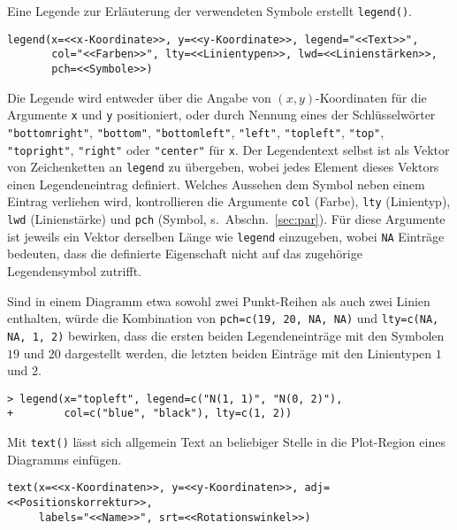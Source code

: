 Eine Legende zur Erläuterung der verwendeten Symbole erstellt \lstinline!legend()!.
\begin{lstlisting}
legend(x=<<x-Koordinate>>, y=<<y-Koordinate>>, legend="<<Text>>",
       col="<<Farben>>", lty=<<Linientypen>>, lwd=<<Linienstärken>>,
       pch=<<Symbole>>)
\end{lstlisting}

Die Legende wird entweder über die Angabe von $(x, y)$-Koordinaten für die Argumente \lstinline!x! und \lstinline!y! positioniert, oder durch Nennung eines der Schlüsselwörter \lstinline!"bottomright"!, \lstinline!"bottom"!, \lstinline!"bottomleft"!, \lstinline!"left"!, \lstinline!"topleft"!, \lstinline!"top"!, \lstinline!"topright"!, \lstinline!"right"! oder \lstinline!"center"! für \lstinline!x!. Der Legendentext selbst ist als Vektor von Zeichenketten an \lstinline!legend! zu übergeben, wobei jedes Element dieses Vektors einen Legendeneintrag definiert. Welches Aussehen dem Symbol neben einem Eintrag verliehen wird, kontrollieren die Argumente \lstinline!col! (Farbe), \lstinline!lty! (Linientyp), \lstinline!lwd! (Linienstärke) und \lstinline!pch! (Symbol, s.\ Abschn.\ \ref{sec:par}). Für diese Argumente ist jeweils ein Vektor derselben Länge wie \lstinline!legend! einzugeben, wobei \lstinline!NA! Einträge bedeuten, dass die definierte Eigenschaft nicht auf das zugehörige Legendensymbol zutrifft.

Sind in einem Diagramm etwa sowohl zwei Punkt-Reihen als auch zwei Linien enthalten, würde die Kombination von \lstinline!pch=c(19, 20, NA, NA)! und \lstinline!lty=c(NA, NA, 1, 2)! bewirken, dass die ersten beiden Legendeneinträge mit den Symbolen $19$ und $20$ dargestellt werden, die letzten beiden Einträge mit den Linientypen $1$ und $2$.
\begin{lstlisting}
> legend(x="topleft", legend=c("N(1, 1)", "N(0, 2)"),
+        col=c("blue", "black"), lty=c(1, 2))
\end{lstlisting}

Mit \lstinline!text()! lässt sich allgemein Text an beliebiger Stelle in die Plot-Region eines Diagramms einfügen.
\begin{lstlisting}
text(x=<<x-Koordinaten>>, y=<<y-Koordinaten>>, adj=<<Positionskorrektur>>,
     labels="<<Name>>", srt=<<Rotationswinkel>>)
\end{lstlisting}

